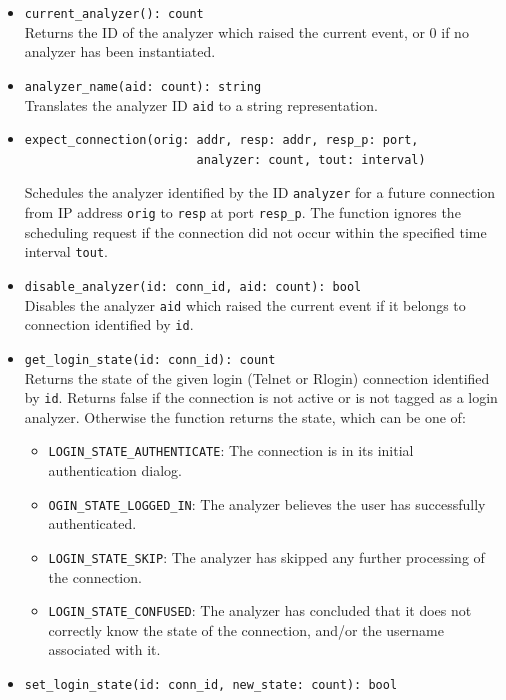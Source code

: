 \documentclass[10pt,landscape]{article}
\newcommand{\verbose}[1]{#1}
\newcommand{\verbose}[1]{}
\begin{document}
\begin{multicols*}{2}
\begin{itemize}
\verbose{
  \item \verb|current_analyzer(): count|\\
    Returns the ID of the analyzer which raised the current event, or 0 if no
    analyzer has been instantiated.
  \item \verb|analyzer_name(aid: count): string|\\
    Translates the analyzer ID \verb|aid| to a string representation.
  \item
\begin{verbatim}
expect_connection(orig: addr, resp: addr, resp_p: port,
          				analyzer: count, tout: interval)
\end{verbatim}
    Schedules the analyzer identified by the ID \verb|analyzer| for a future
    connection from IP address \verb|orig| to \verb|resp| at port
    \verb|resp_p|. The function ignores the scheduling request if the
    connection did not occur within the specified time interval \verb|tout|.
  \item \verb|disable_analyzer(id: conn_id, aid: count): bool|\\
    Disables the analyzer \verb|aid| which raised the current event if it
    belongs to connection identified by \verb|id|.
  \item \verb|get_login_state(id: conn_id): count|\\
    Returns the state of the given login (Telnet or Rlogin) connection
    identified by \texttt{id}. Returns false if the connection is not active
    or is not tagged as a login analyzer. Otherwise the function returns the
    state, which can be one of:
    \begin{itemize}
      \item \verb|LOGIN_STATE_AUTHENTICATE|: The connection is in its initial
        authentication dialog.
      \item \verb|OGIN_STATE_LOGGED_IN|: The analyzer believes the user has
        successfully authenticated.
      \item \verb|LOGIN_STATE_SKIP|: The analyzer has skipped any further
        processing of the connection.
      \item \verb|LOGIN_STATE_CONFUSED|: The analyzer has concluded that it
        does not correctly know the state of the connection, and/or the
        username associated with it.
    \end{itemize}
  \item \verb|set_login_state(id: conn_id, new_state: count): bool|\\
}
\end{itemize}
\end{multicols*}
\end{document}
